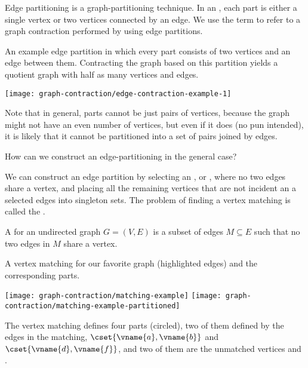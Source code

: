 {Edge partitioning is a graph-partitioning technique.  In an ,  each part is either a single vertex or two vertices
connected by an edge.  We use the term  to
refer to a graph contraction performed by using edge partitions.



\begin{example}
\label{ex:gc::ep::circle}
An example edge partition in which every part consists of two
vertices and an edge between them.  Contracting the graph based on
this partition yields a quotient graph with half as many vertices
and edges.
\begin{center}
\texttt{[image: graph-contraction/edge-contraction-example-1]}
\end{center}

Note that in general, parts cannot be just pairs of vertices, because
the graph might not have an even number of vertices, but even if it
does (no pun intended), it is likely that it cannot be partitioned
into a set of pairs joined by edges.
\end{example}

%
\begin{question}
How can we construct an edge-partitioning in the general case?
\end{question}
%
We can construct an edge partition by selecting an , or ,
where no two edges share a vertex, and placing all the
remaining vertices that are not incident an a selected edges into singleton
sets.
%
The problem of
finding a vertex matching is called the .

\begin{definition} 
A  for an undirected graph $G = (V,E)$
is a subset of edges $M \subseteq E$ such that no two edges in $M$
share a vertex.  
\end{definition}

\begin{example}
\label{ex:gc::ec::matching}
A vertex matching for our favorite graph (highlighted edges) and the
corresponding parts.
\begin{center}
  \texttt{[image: graph-contraction/matching-example]}
\hspace{1in}
  \texttt{[image: graph-contraction/matching-example-partitioned]}
\end{center}
The vertex matching defines four parts (circled), two of them defined
by the edges in the matching, $\cset{\vname{a},\vname{b}}$ and
$\cset{\vname{d},\vname{f}}$, and two of them are the unmatched
vertices  and .
\end{example}


}
